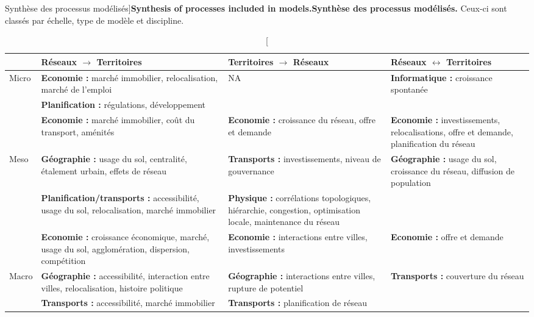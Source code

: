 \begin{table}%
\caption[Synthesis of processes included in models][Synthèse des processus modélisés]{\textbf{Synthesis of processes included in models.}\label{tab:modelography:processes}}{\textbf{Synthèse des processus modélisés.} Ceux-ci sont classés par échelle, type de modèle et discipline. \label{tab:modelography:processes}}
\begin{tabular}{|l|p{5cm}|p{5cm}|p{5cm}|}
\hline
 & Réseaux $\rightarrow$ Territoires & Territoires $\rightarrow$ Réseaux & Réseaux $\leftrightarrow$ Territoires\\ \hline
\multirow{2}{*}{Micro} &
\textbf{Economie : } marché immobilier, relocalisation, marché de l'emploi & NA & \textbf{Informatique : } croissance spontanée \\\cline{2-2}
& \textbf{Planification : } régulations, développement & & \\\hline
& \textbf{Economie : } marché immobilier, coût du transport, aménités & \textbf{Economie : } croissance du réseau, offre et demande & \textbf{Economie : } investissements, relocalisations, offre et demande, planification du réseau\\\cline{2-4}
\multirow{2}{*}{Meso}& \textbf{Géographie : } usage du sol, centralité, étalement urbain, effets de réseau & \textbf{Transports : } investissements, niveau de gouvernance & \textbf{Géographie : } usage du sol, croissance du réseau, diffusion de population \\\cline{2-3}
& \textbf{Planification/transports : } accessibilité, usage du sol, relocalisation, marché immobilier & \textbf{Physique : } corrélations topologiques, hiérarchie, congestion, optimisation locale, maintenance du réseau & \\\hline
& \textbf{Economie : } croissance économique, marché, usage du sol, agglomération, dispersion, compétition & \textbf{Economie : } interactions entre villes, investissements & \textbf{Economie : } offre et demande \\ \cline{2-4}
\multirow{2}{*}{Macro} & \textbf{Géographie : } accessibilité, interaction entre villes, relocalisation, histoire politique & \textbf{Géographie : } interactions entre villes, rupture de potentiel & \textbf{Transports : } couverture du réseau \\\cline{2-3}
& \textbf{Transports : } accessibilité, marché immobilier & \textbf{Transports : } planification de réseau & \\\hline
\end{tabular}
\end{table}

